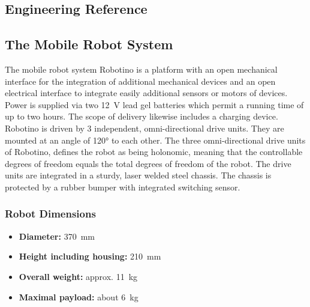 \documentclass[12pt,twoside]{article}
\begin{document}


\begin{appendix}
\newpage

\section{Engineering Reference} \label{apx:sec:engref}
\subsection{The Mobile Robot System}
The mobile robot system Robotino is a platform with an open
mechanical interface for the integration of additional mechanical
devices and an open electrical interface to integrate easily
additional sensors or motors of devices. Power is supplied via two
\SI{12}{\volt} lead gel batteries which permit a running time of up to
two hours.  The scope of delivery likewise includes a charging
device. Robotino is driven by 3 independent, omni-directional drive
units. They are mounted at an angle of \ang{120} to each other. The
three omni-directional drive units of Robotino, defines the robot as
being holonomic, meaning that the controllable degrees of freedom
equals the total degrees of freedom of the robot. The drive units are
integrated in a sturdy, laser welded steel chassis. The chassis is
protected by a rubber bumper with integrated switching sensor.

\subsubsection{Robot Dimensions}\label{apx:sec:robot}
\begin{itemize}
	\item[] \textbf{Diameter:} \SI{370}{\milli\metre}
	\item[] \textbf{Height including housing:} \SI{210}{\milli\metre}
 	\item[] \textbf{Overall weight:} approx. \SI{11}{\kilogram}
 	\item[] \textbf{Maximal payload:} about \SI{6}{\kilogram}
 \end{itemize}


\end{appendix}
\end{document}

